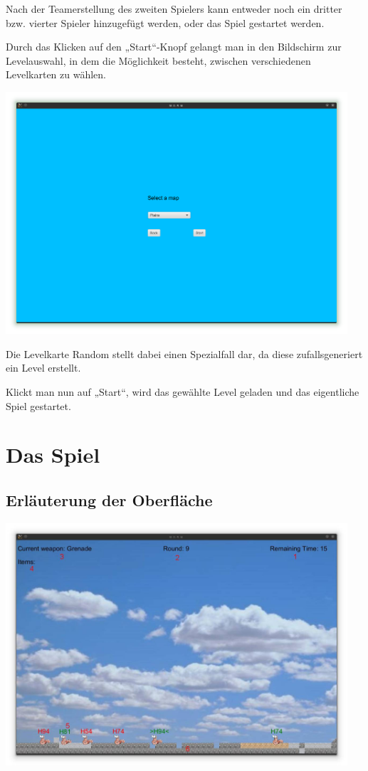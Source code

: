 \documentclass{scrreprt}
\begin{document}
Nach der Teamerstellung des zweiten Spielers kann entweder noch ein dritter bzw. vierter Spieler
hinzugefügt werden, oder das Spiel gestartet werden.

Durch das Klicken auf den „Start“-Knopf gelangt man in den Bildschirm zur Levelauswahl, in dem die Mög\-lichkeit
besteht, zwischen verschiedenen Levelkarten zu wählen.

\includegraphics[height=9cm]{Screenshot7.png}

Die Levelkarte Random stellt dabei einen Spezialfall dar, da diese zufallsgeneriert ein Level erstellt.

Klickt man nun auf „Start“, wird das gewählte Level geladen und das eigentliche Spiel gestartet.

\section{Das Spiel}

\subsection{Erläuterung der Oberfläche}

\includegraphics[height=9cm]{Screenshot13.jpg}
\end{document}
